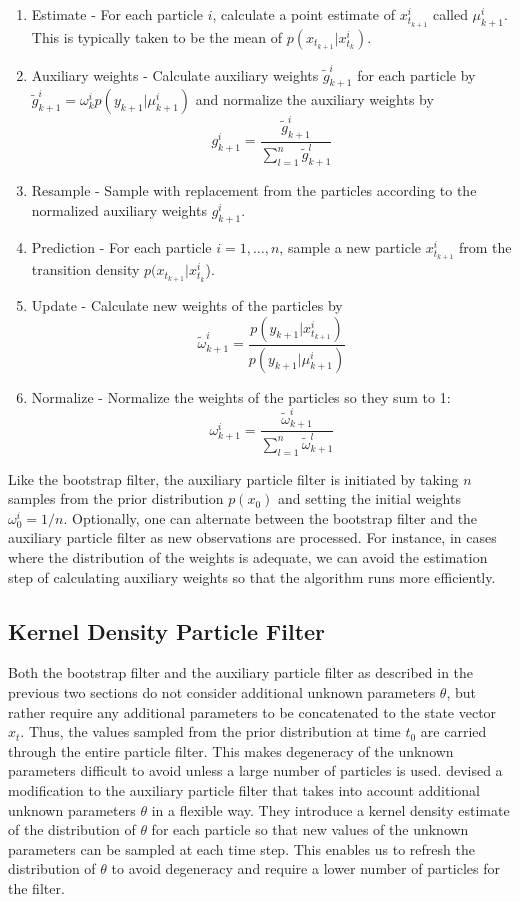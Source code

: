 \documentclass{article}
\begin{document}
\begin{enumerate}
\item Estimate - For each particle $i$, calculate a point estimate of $x_{t_{k+1}}^i$ called $\mu_{k+1}^i$.  This is typically taken to be the mean of $p(x_{t_{k+1}}|x_{t_k}^i)$.
\item Auxiliary weights - Calculate auxiliary weights $\tilde{g}_{k+1}^i$ for each particle by $\tilde{g}_{k+1}^i = \omega_k^i p(y_{k+1}|\mu_{k+1}^i)$ and normalize the auxiliary weights by \[g_{k+1}^i = \frac{\tilde{g}_{k+1}^i}{\sum_{l=1}^n \tilde{g}_{k+1}^l}\]
\item Resample - Sample with replacement from the particles according to the normalized auxiliary weights $g_{k+1}^i$.
\item Prediction - For each particle $i = {1,\ldots,n}$, sample a new particle $x_{t_{k+1}}^i$ from the transition density $p(x_{t_{k+1}}|x_{t_k}^i$).
\item Update - Calculate new weights of the particles by \[\tilde{\omega}_{k+1}^i = \frac{p(y_{k+1}|x_{t_{k+1}}^i)}{p(y_{k+1}|\mu_{k+1}^i)}\]
\item Normalize - Normalize the weights of the particles so they sum to 1: \[\omega_{k+1}^i = \frac{\tilde{\omega}_{k+1}^i}{\sum_{l=1}^n \tilde{\omega}_{k+1}^l}\]
\end{enumerate}

\noindent Like the bootstrap filter, the auxiliary particle filter is initiated by taking $n$ samples from the prior distribution $p(x_0)$ and setting the initial weights $\omega_0^i = 1/n$.  Optionally, one can alternate between the bootstrap filter and the auxiliary particle filter as new observations are processed.  For instance, in cases where the distribution of the weights is adequate, we can avoid the estimation step of calculating auxiliary weights so that the algorithm runs more efficiently.

\subsection{Kernel Density Particle Filter}

Both the bootstrap filter and the auxiliary particle filter as described in the previous two sections do not consider additional unknown parameters $\theta$, but rather require any additional parameters to be concatenated to the state vector $x_t$.  Thus, the values sampled from the prior distribution at time $t_0$ are carried through the entire particle filter.  This makes degeneracy of the unknown parameters difficult to avoid unless a large number of particles is used.  \citet{Liu:West:comb:2001} devised a modification to the auxiliary particle filter that takes into account additional unknown parameters $\theta$ in a flexible way.  They introduce a kernel density estimate of the distribution of $\theta$ for each particle so that new values of the unknown parameters can be sampled at each time step.  This enables us to refresh the distribution of $\theta$ to avoid degeneracy and require a lower number of particles for the filter.
\end{document}
